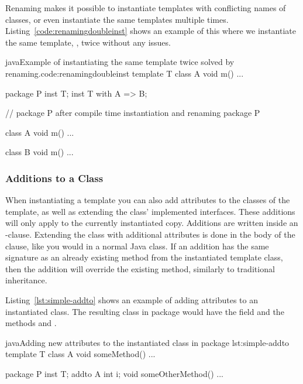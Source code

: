Renaming makes it possible to instantiate templates with conflicting names of classes, or even instantiate the same templates multiple times.
Listing~\vref{code:renamingdoubleinst} shows an example of this where we instantiate the same template, , twice without any issues.

\begin{code}{java}{Example of instantiating the same template twice solved by renaming.}{code:renamingdoubleinst}
template T {
    class A {
        void m() { ... }
    }
}

package P {
    inst T;
    inst T with A => B;
}

// package P after compile time instantiation and renaming
package P {
    class A {
        void m() { ... }
    }

    class B {
        void m() { ... }
    }
}
\end{code}

\subsubsection{Additions to a Class}\label{subsubsec:additions}

When instantiating a template you can also add attributes to the classes of the template, as well as extending the class' implemented interfaces.
These additions will only apply to the currently instantiated copy.
Additions are written inside an -clause.
Extending the class with additional attributes is done in the body of the clause, like you would in a normal Java class.
If an addition has the same signature as an already existing method from the instantiated template class, then the addition will override the existing method, similarly to traditional inheritance.

Listing~\vref{lst:simple-addto} shows an example of adding attributes to an instantiated class.
The resulting class  in package  would have the field  and the methods  and .

\begin{code}{java}{Adding new attributes to the instantiated class  in package }{lst:simple-addto}
    template T {
        class A {
            void someMethod() { ... }
        }
    }

    package P {
        inst T;
        addto A {
            int i;
            void someOtherMethod() { ... }
        }
    }
\end{code}

